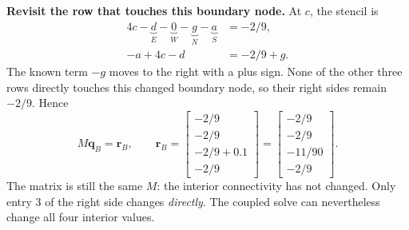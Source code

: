 \textbf{Revisit the row that touches this boundary node.} At $c$, the stencil is
\begin{align*}
4c-\underbrace{d}_{E}-\underbrace{0}_{W}
-\underbrace{g}_{N}-\underbrace{a}_{S}&=-2/9,\\
-a+4c-d&=-2/9+g.
\end{align*}
The known term $-g$ moves to the right with a plus sign. None of the other
three rows directly touches this changed boundary node, so their right sides
remain $-2/9$. Hence
\[
M\boldsymbol q_B=\boldsymbol r_B,
\qquad
\boldsymbol r_B=\begin{bmatrix}-2/9\\-2/9\\-2/9+0.1\\-2/9\end{bmatrix}
=\begin{bmatrix}-2/9\\-2/9\\-11/90\\-2/9\end{bmatrix}.
\]
The matrix is still the same $M$: the interior connectivity has not changed.
Only entry 3 of the right side changes \emph{directly}. The coupled solve can
nevertheless change all four interior values.

